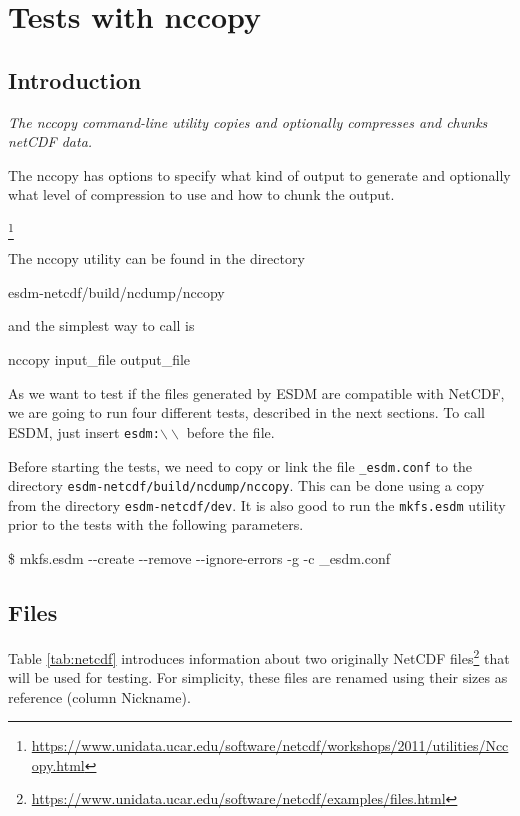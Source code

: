\chapter{Tests with nccopy}
\label{ch:nccopy}

\section{Introduction}

{\itshape
The nccopy command-line utility copies and optionally compresses and chunks netCDF data.

The nccopy has options to specify what kind of output to generate and optionally what level of compression to use and how to chunk the output.
}\footnote{\url{https://www.unidata.ucar.edu/software/netcdf/workshops/2011/utilities/Nccopy.html}}

The nccopy utility can be found in the directory

\begin{framed}
esdm-netcdf/build/ncdump/nccopy
\end{framed}

and the simplest way to call is

\begin{framed}
nccopy input\_file output\_file
\end{framed}

As we want to test if the files generated by ESDM are compatible with NetCDF, we are going to run four different tests, described in the next sections. To call ESDM, just insert \texttt{esdm:$\backslash\backslash$} before the file.

Before starting the tests, we need to copy or link the file \texttt{\_esdm.conf} to the directory \texttt{esdm-netcdf/build/ncdump/nccopy}. This can be done using a copy from the directory \texttt{esdm-netcdf/dev}.
It is also good to run the \texttt{mkfs.esdm} utility prior to the tests with the following parameters.

\begin{framed}
\$ mkfs.esdm {-}{-}create {-}{-}remove {-}{-}ignore-errors -g -c \_esdm.conf
\end{framed}

\section{Files}

Table \ref{tab:netcdf} introduces information about two originally NetCDF files\footnote{\url{https://www.unidata.ucar.edu/software/netcdf/examples/files.html}} that will be used for testing.
For simplicity, these files are renamed using their sizes as reference (column Nickname).

